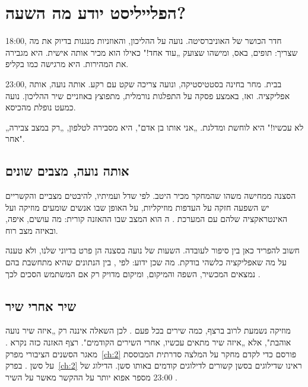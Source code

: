 
\chapter{הפלייליסט יודע מה השעה?}\label{ch:5}

\begin{scene}
18:00, חדר הכושר של האוניברסיטה. נועה על ההליכון, והאוזניות מנגנות בדיוק את מה שצריך: תופים, באס, ומישהו שצועק „עוד אחד!" כאילו הוא מכיר אותה אישית. היא מגבירה את המהירות. היא מרגישה כמו בקליפ.

23:00, בבית. מחר בחינה בסטטיסטיקה, ונועה צריכה שקט עם רקע. אותה נועה, אותה אפליקציה. ואז, באמצע פסקה על התפלגות נורמלית, מתפוצץ באוזניים שיר ההליכון. נועה כמעט נופלת מהכיסא.

„לא עכשיו!" היא לוחשת ומדלגת. „אני אותו בן אדם", היא מסבירה לטלפון, „רק במצב צבירה אחר".
\end{scene}

\section{אותה נועה, מצבים שונים}

הסצנה ממחישה משהו שהמחקר מכיר היטב. לפי שדל ועמיתיו, להיבטים מצביים והקשריים יש השפעה חזקה על העדפות מוזיקליות, על האופן שבו אנשים שומעים מוזיקה ועל האינטראקציה שלהם עם המערכת \cite{schedl2018current}. ה הוא המצב שבו ההאזנה קורית: מה עושים, איפה, ובאיזה מצב רוח.

חשוב להפריד כאן בין סיפור לעובדה. השעות של נועה בסצנה הן פרט בדיוני שלנו, ולא טענה על מה שאפליקציה כלשהי בודקת. מה שכן ידוע: לפי , בין הנתונים שהיא מתחשבת בהם נמצאים המכשיר, השפה והמיקום, ומיקום מדויק רק אם המשתמש הסכים לכך \cite{spotify2026understanding}.

\section{שיר אחרי שיר}

מוזיקה נשמעת לרוב ברצף, כמה שירים בכל פעם \cite{schedl2018current}. לכן השאלה איננה רק „איזה שיר נועה אוהבת", אלא „איזה שיר מתאים עכשיו, אחרי השירים הקודמים". רצף האזנה כזה נקרא . מאגר הסשנים הציבורי מפרק~\ref{ch:2} פורסם כדי לקדם מחקר על המלצה סדרתית המבוססת על סשן \cite{brost2019music}. בפרק~\ref{ch:2} ראינו שדילוגים בסשן קשורים לדילוגים קודמים באותו סשן. הדילוג של 23:00 מספר אפוא יותר על ההקשר מאשר על השיר \cite{schedl2018current}.

